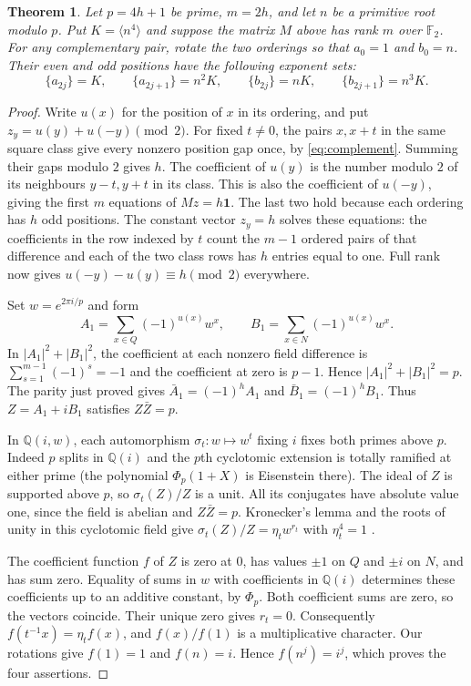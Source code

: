 \documentclass[11pt,a4paper]{article}
\newtheorem{theorem}{Theorem}[section]
\numberwithin{equation}{section}
\begin{document}
\begin{theorem}\label{prime:quartic}
Let $p=4h+1$ be prime, $m=2h$, and let $n$ be a primitive root modulo $p$. Put $K=\langle n^4\rangle$ and suppose the matrix $M$ above has rank $m$ over $\mathbb F_2$. For any complementary pair, rotate the two orderings so that $a_0=1$ and $b_0=n$. Their even and odd positions have the following exponent sets:
\[
 \{a_{2j}\}=K,\qquad \{a_{2j+1}\}=n^2K,\qquad
 \{b_{2j}\}=nK,\qquad \{b_{2j+1}\}=n^3K .
\]
\end{theorem}
\begin{proof}
Write $u(x)$ for the position of $x$ in its ordering, and put $z_y=u(y)+u(-y)\pmod2$. For fixed $t\ne0$, the pairs $x,x+t$ in the same square class give every nonzero position gap once, by \eqref{eq:complement}. Summing their gaps modulo $2$ gives $h$. The coefficient of $u(y)$ is the number modulo $2$ of its neighbours $y-t,y+t$ in its class. This is also the coefficient of $u(-y)$, giving the first $m$ equations of $Mz=h\mathbf1$. The last two hold because each ordering has $h$ odd positions. The constant vector $z_y=h$ solves these equations: the coefficients in the row indexed by $t$ count the $m-1$ ordered pairs of that difference and each of the two class rows has $h$ entries equal to one. Full rank now gives $u(-y)-u(y)\equiv h\pmod2$ everywhere.

Set $w=e^{2\pi i/p}$ and form
\[
 A_1=\sum_{x\in Q}(-1)^{u(x)}w^x,\qquad B_1=\sum_{x\in N}(-1)^{u(x)}w^x.
\]
In $|A_1|^2+|B_1|^2$, the coefficient at each nonzero field difference is $\sum_{s=1}^{m-1}(-1)^s=-1$ and the coefficient at zero is $p-1$. Hence $|A_1|^2+|B_1|^2=p$. The parity just proved gives $\bar A_1=(-1)^h A_1$ and $\bar B_1=(-1)^h B_1$. Thus $Z=A_1+iB_1$ satisfies $Z\bar Z=p$.

In $\mathbb Q(i,w)$, each automorphism $\sigma_t:w\mapsto w^t$ fixing $i$ fixes both primes above $p$. Indeed $p$ splits in $\mathbb Q(i)$ and the $p$th cyclotomic extension is totally ramified at either prime (the polynomial $\Phi_p(1+X)$ is Eisenstein there). The ideal of $Z$ is supported above $p$, so $\sigma_t(Z)/Z$ is a unit. All its conjugates have absolute value one, since the field is abelian and $Z\bar Z=p$. Kronecker's lemma and the roots of unity in this cyclotomic field give $\sigma_t(Z)/Z=\eta_t w^{r_t}$ with $\eta_t^4=1$ \cite{washington}.

The coefficient function $f$ of $Z$ is zero at $0$, has values $\pm1$ on $Q$ and $\pm i$ on $N$, and has sum zero. Equality of sums in $w$ with coefficients in $\mathbb Q(i)$ determines these coefficients up to an additive constant, by $\Phi_p$. Both coefficient sums are zero, so the vectors coincide. Their unique zero gives $r_t=0$. Consequently $f(t^{-1}x)=\eta_t f(x)$, and $f(x)/f(1)$ is a multiplicative character. Our rotations give $f(1)=1$ and $f(n)=i$. Hence $f(n^j)=i^j$, which proves the four assertions.
\end{proof}
\end{document}
